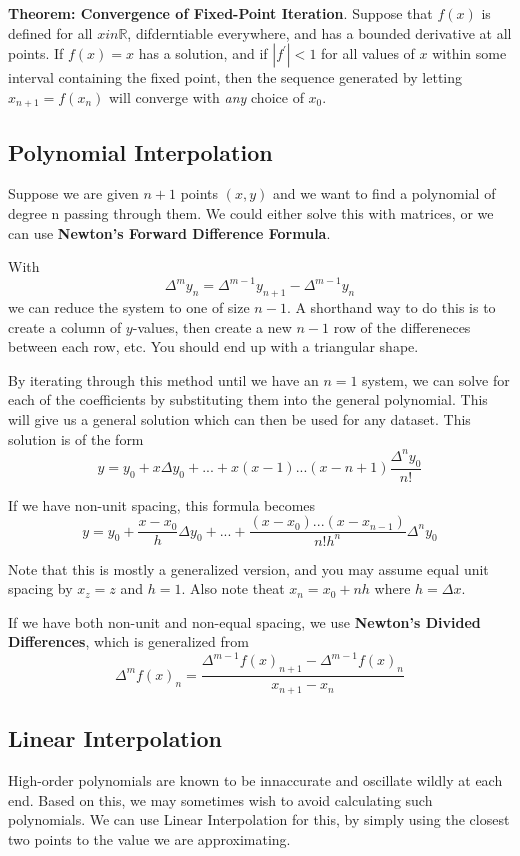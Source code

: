 \documentclass[12pt]{article}
\begin{document}
{\bf Theorem: Convergence of Fixed-Point Iteration}. Suppose that $f(x)$ is defined for all $x in \mathbb{R}$, difderntiable everywhere, and has a bounded derivative at all points. If $f(x) = x$ has a solution, and if $|f^\prime| < 1$ for all values of $x$ within some interval containing the fixed point, then the sequence generated by letting $x_{n+1} = f(x_n)$ will converge with \emph{any} choice of $x_0$.

\subsection*{Polynomial Interpolation}
Suppose we are given $n+1$ points $(x,y)$ and we want to find a polynomial of degree n passing through them. We could either solve this with matrices, or we can use {\bf Newton's Forward Difference Formula}.

With \[ \Delta^m y_n = \Delta^{m-1} y_{n+1} - \Delta^{m-1} y_n \] we can reduce the system to one of size $n-1$. A shorthand way to do this is to create a column of $y$-values, then create a new $n-1$ row of the differeneces between each row, etc. You should end up with a triangular shape.

By iterating through this method until we have an $n = 1$ system, we can solve for each of the coefficients by substituting them into the general polynomial. This will give us a general solution which can then be used for any dataset. This solution is of the form \[ y = y_0 + x\Delta y_0 + ... + x(x - 1)...(x - n + 1)\frac{\Delta^ny_0}{n!} \]

If we have non-unit spacing, this formula becomes \[ y = y_0 + \frac{x - x_0}{h}\Delta y_0 + ... + \frac{(x - x_0)...(x - x_{n-1})}{n!h^n}\Delta^n y_0 \]

Note that this is mostly a generalized version, and you may assume equal unit spacing by $x_z = z$ and $h = 1$. Also note theat $x_n = x_0 + nh$ where $h = \Delta x$.

If we have both non-unit and non-equal spacing, we use {\bf Newton's Divided Differences}, which is generalized from \[ \Delta^m f(x)_n = \frac{\Delta^{m-1} f(x)_{n+1} - \Delta^{m-1} f(x)_n}{x_{n+1} - x_n} \]

\subsection*{Linear Interpolation}
High-order polynomials are known to be innaccurate and oscillate wildly at each end. Based on this, we may sometimes wish to avoid calculating such polynomials. We can use Linear Interpolation for this, by simply using the closest two points to the value we are approximating.
\end{document}
